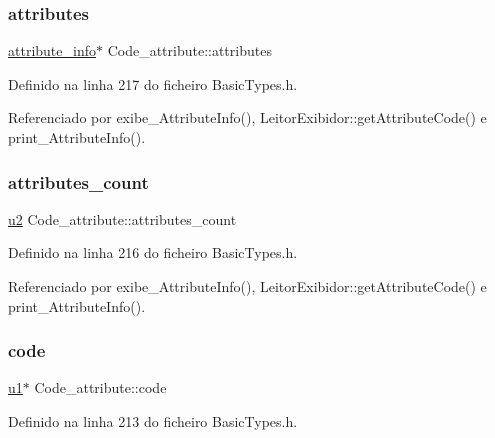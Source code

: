 \subsubsection{\texorpdfstring{attributes}{attributes}}
{\footnotesize\ttfamily \hyperlink{structattribute__info}{attribute\+\_\+info}$\ast$ Code\+\_\+attribute\+::attributes}



Definido na linha 217 do ficheiro Basic\+Types.\+h.



Referenciado por exibe\+\_\+\+Attribute\+Info(), Leitor\+Exibidor\+::get\+Attribute\+Code() e print\+\_\+\+Attribute\+Info().

\mbox{\label{structCode__attribute_a9ca1435aa65ae02d764ff53a36fb842f}} 
\subsubsection{\texorpdfstring{attributes\+\_\+count}{attributes\_count}}
{\footnotesize\ttfamily \hyperlink{BasicTypes_8h_a732cde1300aafb73b0ea6c2558a7a54f}{u2} Code\+\_\+attribute\+::attributes\+\_\+count}



Definido na linha 216 do ficheiro Basic\+Types.\+h.



Referenciado por exibe\+\_\+\+Attribute\+Info(), Leitor\+Exibidor\+::get\+Attribute\+Code() e print\+\_\+\+Attribute\+Info().

\mbox{\label{structCode__attribute_a26d83aeded05528b11dd486555d1ece2}} 
\subsubsection{\texorpdfstring{code}{code}}
{\footnotesize\ttfamily \hyperlink{BasicTypes_8h_ad9f4cdb6757615aae2fad89dab3c5470}{u1}$\ast$ Code\+\_\+attribute\+::code}



Definido na linha 213 do ficheiro Basic\+Types.\+h.



